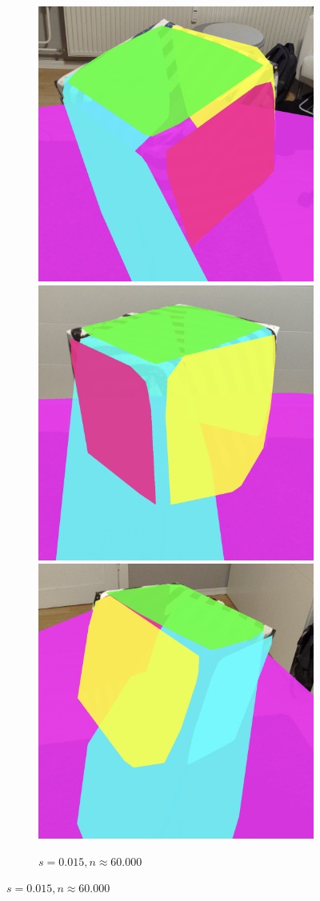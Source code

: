 \begin{figure}[h!tbp]
    \centering

    \begin{subfigure}[b]{\textwidth}
        \centering
        \includegraphics[width=0.3\linewidth]{images/cube_015_1}
        \includegraphics[width=0.3\linewidth]{images/cube_015_2}
        \includegraphics[width=0.3\linewidth]{images/cube_015_3}
        \caption{$s=0.015, n\approx60.000$}
    \end{subfigure}%

    \vspace{0.5em}


\end{figure}
